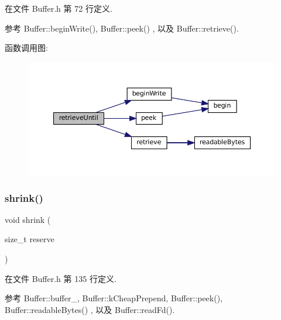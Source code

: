 在文件 Buffer.\+h 第 72 行定义.



参考 Buffer\+::begin\+Write(), Buffer\+::peek() , 以及 Buffer\+::retrieve().

函数调用图\+:
\nopagebreak
\begin{figure}[H]
\begin{center}
\leavevmode
\includegraphics[width=350pt]{classmuduo_1_1Buffer_abffa19bdb1fbf4ac36fe0f2375bee1e5_cgraph}
\end{center}
\end{figure}
\mbox{\label{classmuduo_1_1Buffer_a69095875ff26fe7eff163afde6eb7c9e}} 
\subsubsection{\texorpdfstring{shrink()}{shrink()}}
{\footnotesize\ttfamily void shrink (\begin{DoxyParamCaption}\item[{size\+\_\+t}]{reserve }\end{DoxyParamCaption})\hspace{0.3cm}{\ttfamily [inline]}}



在文件 Buffer.\+h 第 135 行定义.



参考 Buffer\+::buffer\+\_\+, Buffer\+::k\+Cheap\+Prepend, Buffer\+::peek(), Buffer\+::readable\+Bytes() , 以及 Buffer\+::read\+Fd().

